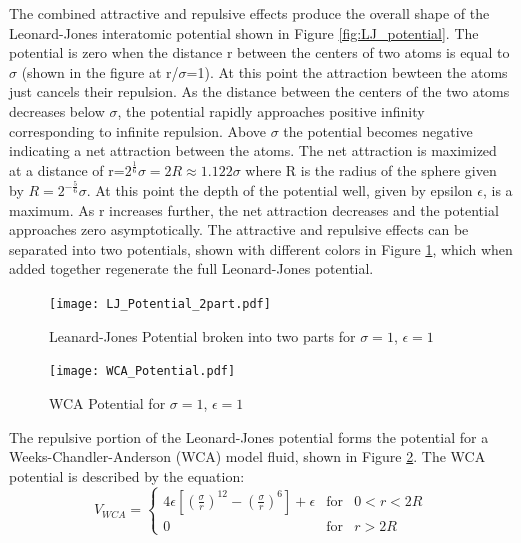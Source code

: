 \documentclass[double,12pt]{beavtex}
\begin{document}
The combined attractive and repulsive effects produce the overall shape of the Leonard-Jones interatomic potential shown in Figure \ref{fig:LJ_potential}. The potential is zero when the distance r between the centers of two atoms is equal to $\sigma$ (shown in the figure at r/$\sigma$=1). At this point the attraction bewteen the atoms just cancels their repulsion. As the distance between the centers of the two atoms decreases below $\sigma$, the potential rapidly approaches positive infinity corresponding to infinite repulsion. Above $\sigma$ the potential becomes negative indicating a net attraction between the atoms. The net attraction is maximized at a distance of r=$2^\frac{1}{6}\sigma=2R\approx{1.122}\sigma$ where R is the radius of the sphere given by $R={2^{-\frac{5}{6}}}\sigma$. At this point the depth of the potential well, given by epsilon $\epsilon$, is a maximum. As r increases further, the net attraction decreases and the potential approaches zero asymptotically. The attractive and repulsive effects can be separated into two potentials, shown with different colors in Figure \ref{fig:LJ_potential_2parts}, which when added together regenerate the full Leonard-Jones potential. 

\begin{figure}[h!]
    \centering
    \texttt{[image: LJ\_Potential\_2part.pdf]}
    \caption{Leanard-Jones Potential broken into two parts for $\sigma=1$, $\epsilon=1$}
    \label{fig:LJ_potential_2parts}
  \end{figure}

\begin{figure}[h!]
    \centering
    \texttt{[image: WCA\_Potential.pdf]}
    \caption{WCA Potential for $\sigma=1$, $\epsilon=1$}
    \label{fig:WCA_potential}
  \end{figure}

The repulsive portion of the Leonard-Jones potential forms the potential for a Weeks-Chandler-Anderson (WCA) model fluid, shown in Figure \ref{fig:WCA_potential}. The WCA potential is described by the equation: \begin{equation}{V_{WCA}=\left\{\begin{array}{rcl} {4\epsilon{\left[\left(\frac{\sigma}{r}\right)^{12} - \left(\frac{\sigma}{r}\right)^6 \right]}+\epsilon} & \mbox{for} & 0<r<{2R} \\ 0 & \mbox{for} & r>2R \end{array}\right.}\end{equation} 
\end{document}

